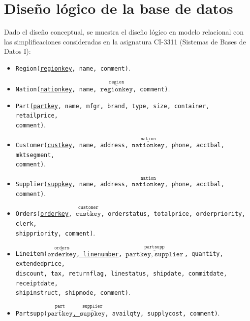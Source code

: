 \documentclass[12pt, letter paper]{report}
\begin{document}
  \section{Diseño lógico de la base de datos} %
  \label{ssub:diseño_lógico_de_la_base_de_datos}
    Dado el diseño conceptual, se muestra el diseño lógico en modelo relacional
    \cite{transactionprocessingperformancecounciltpctpc2022} con las
    simplificaciones consideradas en la asignatura CI-3311 (Sistemas de Bases de
    Datos I):
    \begin{itemize}
      \item \texttt{Region(\underline{regionkey}, name, comment)}.
      \item \texttt{Nation(\underline{nationkey}, name, $\overset{
        \texttt{region}}{\overline{\texttt{regionkey}}}$, comment)}.
      \item \texttt{Part(\underline{partkey}, name, mfgr, brand, type, size,
      container, retailprice, \\comment)}.
      \item \texttt{Customer(\underline{custkey}, name, address,
      $\overset{\texttt{nation}}{\overline{\texttt{nationkey}}}$, phone,
      acctbal, mktsegment, \\comment)}.
      \item \texttt{Supplier(\underline{suppkey}, name, address,
      $\overset{\texttt{nation}}{\overline{\texttt{nationkey}}}$, phone,
      acctbal, comment)}.
      \item \texttt{Orders(\underline{orderkey}, $\overset{
        \texttt{customer}}{\overline{\texttt{custkey}}}$, orderstatus,
        totalprice, orderpriority, clerk, \\shippriority, comment)}.
      \item \texttt{Lineitem(\underline{$\overset{\texttt{orders}}{
        \overline{\texttt{orderkey}}}$, linenumber}, $\overset{\texttt{
        partsupp}}{\overline{\texttt{partkey},\ \texttt{supplier}}}$,
        quantity, extendedprice, \\
        discount, tax, returnflag, linestatus, shipdate, commitdate,
        receiptdate, \\shipinstruct, shipmode, comment)}.
      \item \texttt{Partsupp(\underline{$\overset{\texttt{part}}{
        \overline{\texttt{partkey}}}$, $\overset{\texttt{supplier}}{
        \overline{\texttt{suppkey}}}$}, availqty, supplycost, comment)}.
    \end{itemize}
\end{document}
